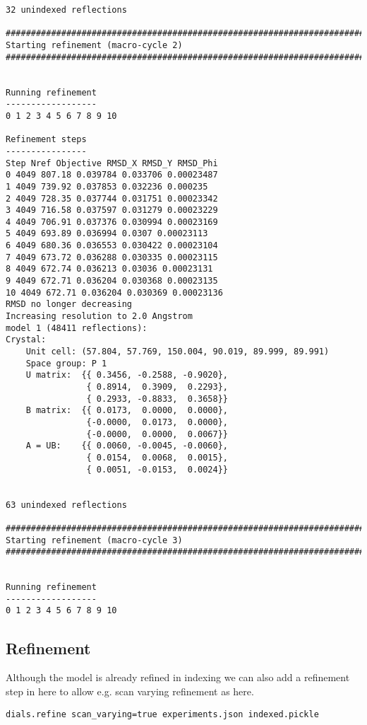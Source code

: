 \documentclass[a4paper, 11pt]{article}
\begin{document}
{\begin{verbatim}
32 unindexed reflections

################################################################################
Starting refinement (macro-cycle 2)
################################################################################


Running refinement
------------------
0 1 2 3 4 5 6 7 8 9 10

Refinement steps
----------------
Step Nref Objective RMSD_X RMSD_Y RMSD_Phi
0 4049 807.18 0.039784 0.033706 0.00023487 
1 4049 739.92 0.037853 0.032236 0.000235 
2 4049 728.35 0.037744 0.031751 0.00023342 
3 4049 716.58 0.037597 0.031279 0.00023229 
4 4049 706.91 0.037376 0.030994 0.00023169 
5 4049 693.89 0.036994 0.0307 0.00023113 
6 4049 680.36 0.036553 0.030422 0.00023104 
7 4049 673.72 0.036288 0.030335 0.00023115 
8 4049 672.74 0.036213 0.03036 0.00023131 
9 4049 672.71 0.036204 0.030368 0.00023135 
10 4049 672.71 0.036204 0.030369 0.00023136 
RMSD no longer decreasing
Increasing resolution to 2.0 Angstrom
model 1 (48411 reflections):
Crystal:
    Unit cell: (57.804, 57.769, 150.004, 90.019, 89.999, 89.991)
    Space group: P 1
    U matrix:  {{ 0.3456, -0.2588, -0.9020},
                { 0.8914,  0.3909,  0.2293},
                { 0.2933, -0.8833,  0.3658}}
    B matrix:  {{ 0.0173,  0.0000,  0.0000},
                {-0.0000,  0.0173,  0.0000},
                {-0.0000,  0.0000,  0.0067}}
    A = UB:    {{ 0.0060, -0.0045, -0.0060},
                { 0.0154,  0.0068,  0.0015},
                { 0.0051, -0.0153,  0.0024}}


63 unindexed reflections

################################################################################
Starting refinement (macro-cycle 3)
################################################################################


Running refinement
------------------
0 1 2 3 4 5 6 7 8 9 10
\end{verbatim}
}

\subsection{Refinement}

Although the model is already refined in indexing we can also add a
refinement step in here to allow e.g. scan varying refinement as here.

{\small
\begin{verbatim}
dials.refine scan_varying=true experiments.json indexed.pickle
\end{verbatim}
}
\end{document}
